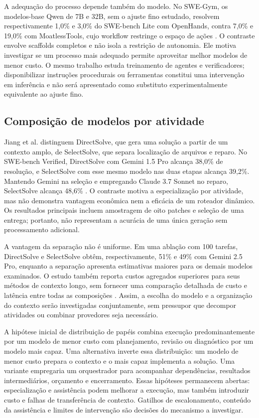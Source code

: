 A adequação do processo depende também do modelo. No SWE-Gym, os modelos-base Qwen de 7B e 32B, sem o ajuste fino estudado, resolvem respectivamente 1,0\% e 3,0\% do SWE-bench Lite com OpenHands, contra 7,0\% e 19,0\% com MoatlessTools, cujo workflow restringe o espaço de ações \cite{Pan2025SWEGym}. O contraste envolve scaffolds completos e não isola a restrição de autonomia. Ele motiva investigar se um processo mais adequado permite aproveitar melhor modelos de menor custo. O mesmo trabalho estuda treinamento de agentes e verificadores; disponibilizar instruções procedurais ou ferramentas constitui uma intervenção em inferência e não será apresentado como substituto experimentalmente equivalente ao ajuste fino.

\subsection{Composição de modelos por atividade}

Jiang et al. distinguem DirectSolve, que gera uma solução a partir de um contexto amplo, de SelectSolve, que separa localização de arquivos e reparo. No SWE-bench Verified, DirectSolve com Gemini 1.5 Pro alcança 38,0\% de resolução, e SelectSolve com esse mesmo modelo nas duas etapas alcança 39,2\%. Mantendo Gemini na seleção e empregando Claude 3.7 Sonnet no reparo, SelectSolve alcança 48,6\% \cite{Jiang2025LCLM}. O contraste motiva a especialização por atividade, mas não demonstra vantagem econômica nem a eficácia de um roteador dinâmico. Os resultados principais incluem amostragem de oito patches e seleção de uma entrega; portanto, não representam a acurácia de uma única geração sem processamento adicional.

A vantagem da separação não é uniforme. Em uma ablação com 100 tarefas, DirectSolve e SelectSolve obtêm, respectivamente, 51\% e 49\% com Gemini 2.5 Pro, enquanto a separação apresenta estimativas maiores para os demais modelos examinados. O estudo também reporta custos agregados superiores para seus métodos de contexto longo, sem fornecer uma comparação detalhada de custo e latência entre todas as composições \cite{Jiang2025LCLM}. Assim, a escolha do modelo e a organização do contexto serão investigadas conjuntamente, sem pressupor que decompor atividades ou combinar provedores seja necessário.

A hipótese inicial de distribuição de papéis combina execução predominantemente por um modelo de menor custo com planejamento, revisão ou diagnóstico por um modelo mais capaz. Uma alternativa inverte essa distribuição: um modelo de menor custo prepara o contexto e o mais capaz implementa a solução. Uma variante empregaria um orquestrador para acompanhar dependências, resultados intermediários, orçamento e encerramento. Essas hipóteses permanecem abertas: especialização e assistência podem melhorar a execução, mas também introduzir custo e falhas de transferência de contexto. Gatilhos de escalonamento, conteúdo da assistência e limites de intervenção são decisões do mecanismo a investigar.

